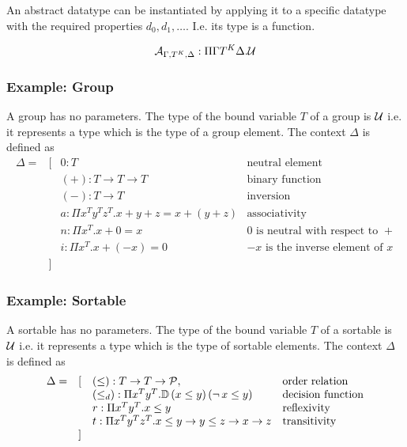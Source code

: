 An abstract datatype can be instantiated by applying it to a specific datatype
with the required properties $d_0, d_1, \ldots$. I.e. its type is a function.

$$
{\cal{A}}_{\Gamma,T^K,\Delta}
:
\Pi \Gamma T^K \Delta. {\cal{U}}
$$

\subsubsection{Example: Group}
A group has no parameters. The type of the bound variable $T$ of a group is
${\cal{U}}$ i.e. it represents a type which is the type of a group element. The
context $\Delta$ is defined as
$$
\begin{array}{llll}
  \Delta =
  &[
  & 0: T
  & \text{neutral element}
  \\
  &
  & (+): T \to T \to T
  & \text{binary function}
  \\
  &
  & (-): T \to T
  & \text{inversion}
  \\
  &
  & a: \Pi x^T y^T z^T. x + y + z = x + (y + z)
  & \text{associativity}
  \\
  &
  & n: \Pi x^T. x + 0 = x
  & 0 \text{ is neutral with respect to } +
  \\
  &
  & i: \Pi x^T. x + (-x) = 0
  & -x \text{ is the inverse element of } x
  \\
  &]
\end{array}
$$






\subsubsection{Example: Sortable}

A sortable has no parameters. The type of the bound variable $T$ of a sortable
is ${\cal{U}}$ i.e. it represents a type which is the type of sortable
elements. The context $\Delta$ is defined as
$$
\begin{array}{llll}
  \Delta =
  &[
  & (\le): T \to T \to {\cal{P}},
  & \text{order relation}
  \\
  &
  & (\le_d): \Pi x^T y^T . {\mathbb{D}}\,(x \le y)\, (\lnot\, x \le y)
  & \text{decision function}
  \\
  &
  & r: \Pi x^T y^T. x \le y
  & \text{reflexivity}
  \\
  &
  & t: \Pi x^T y^T z^T. x \le y \to y \le z \to x \to z
  & \text{transitivity}
  \\
  &]
\end{array}
$$


